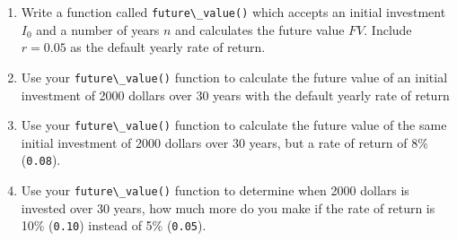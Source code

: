 \documentclass{book}
\newcommand{\passthrough}[1]{#1}
\begin{document}
\begin{enumerate}
\def\labelenumi{(\alph{enumi})}
\item
  Write a function called \passthrough{\lstinline!future\_value()!}
  which accepts an initial investment \(I_0\) and a number of years
  \(n\) and calculates the future value \(FV\). Include \(r=0.05\) as
  the default yearly rate of return.
\item
  Use your \passthrough{\lstinline!future\_value()!} function to
  calculate the future value of an initial investment of 2000 dollars
  over 30 years with the default yearly rate of return
\item
  Use your \passthrough{\lstinline!future\_value()!} function to
  calculate the future value of the same initial investment of 2000
  dollars over 30 years, but a rate of return of 8\%
  (\passthrough{\lstinline!0.08!}).
\item
  Use your \passthrough{\lstinline!future\_value()!} function to
  determine when 2000 dollars is invested over 30 years, how much more
  do you make if the rate of return is 10\%
  (\passthrough{\lstinline!0.10!}) instead of 5\%
  (\passthrough{\lstinline!0.05!}).
\end{enumerate}
    
\end{document}
